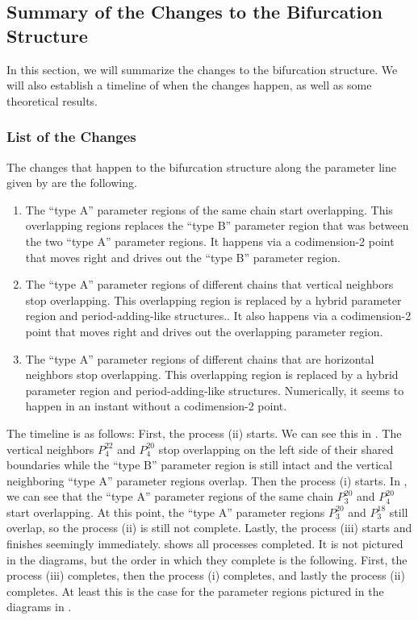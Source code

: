 \subsection{Summary of the Changes to the Bifurcation Structure}

In this section, we will summarize the changes to the bifurcation structure.
We will also establish a timeline of when the changes happen, as well as some theoretical results.

\subsubsection{List of the Changes}

The changes that happen to the bifurcation structure along the parameter line given by   are the following.
\begin{enumerate}
	\item The ``type A'' parameter regions of the same chain start overlapping.
	      This overlapping regions replaces the ``type B'' parameter region that was between the two ``type A'' parameter regions.
	      It happens via a codimension-2 point that moves right and drives out the ``type B'' parameter region.

	\item The ``type A'' parameter regions of different chains that vertical neighbors stop overlapping.
	      This overlapping region is replaced by a hybrid parameter region and period-adding-like structures..
	      It also happens via a codimension-2 point that moves right and drives out the overlapping parameter region.

	\item The ``type A'' parameter regions of different chains that are horizontal neighbors stop overlapping.
	      This overlapping region is replaced by a hybrid parameter region and period-adding-like structures.
	      Numerically, it seems to happen in an instant without a codimension-2 point.
\end{enumerate}

The timeline is as follows:
First, the process (ii) starts.
We can see this in .
The vertical neighbors $P^{22}_4$ and $P^{20}_4$ stop overlapping on the left side of their shared boundaries while the ``type B'' parameter region is still intact and the vertical neighboring ``type A'' parameter regions overlap.
Then the process (i) starts.
In , we can see that the ``type A'' parameter regions of the same chain $P^{20}_3$ and $P^{20}_4$ start overlapping.
At this point, the ``type A'' parameter regions $P^{20}_3$ and $P^{18}_3$ still overlap, so the process (ii) is still not complete.
Lastly, the process (iii) starts and finishes seemingly immediately.
 shows all processes completed.
It is not pictured in the diagrams, but the order in which they complete is the following.
First, the process (iii) completes, then the process (i) completes, and lastly the process (ii) completes.
At least this is the case for the parameter regions pictured in the diagrams in .

